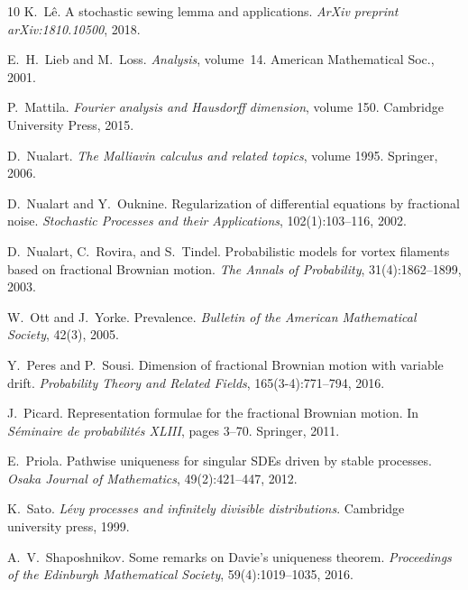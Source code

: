 \documentclass[10pt]{article}
\newcommand{\tmtextit}[1]{{\itshape{#1}}}
\begin{document}
\begin{thebibliography}{10}
  K.~L{\^e}. {\newblock}A stochastic sewing lemma and
  applications. {\newblock}\tmtextit{ArXiv preprint arXiv:1810.10500},
  2018.{\newblock}
  
  E.~H.~Lieb  and  M.~Loss. {\newblock}\tmtextit{Analysis}, 
  volume~14. {\newblock}American Mathematical Soc., 2001.{\newblock}
  
  P.~Mattila. {\newblock}\tmtextit{Fourier analysis and
  Hausdorff dimension},  volume  150. {\newblock}Cambridge University Press,
  2015.{\newblock}
  
  D.~Nualart. {\newblock}\tmtextit{The Malliavin
  calculus and related topics},  volume  1995. {\newblock}Springer,
  2006.{\newblock}
  
  D.~Nualart  and  Y.~Ouknine.
  {\newblock}Regularization of differential equations by fractional noise.
  {\newblock}\tmtextit{Stochastic Processes and their Applications},
  102(1):103--116, 2002.{\newblock}
  
  D.~Nualart, C.~Rovira, and  S.~Tindel.
  {\newblock}Probabilistic models for vortex filaments based on fractional
  Brownian motion. {\newblock}\tmtextit{The Annals of Probability},
  31(4):1862--1899, 2003.{\newblock}
  
  W.~Ott  and  J.~Yorke. {\newblock}Prevalence.
  {\newblock}\tmtextit{Bulletin of the American Mathematical Society}, 42(3),
  2005.{\newblock}
  
  Y.~Peres  and  P.~Sousi. {\newblock}Dimension of
  fractional Brownian motion with variable drift.
  {\newblock}\tmtextit{Probability Theory and Related Fields},
  165(3-4):771--794, 2016.{\newblock}
  
  J.~Picard. {\newblock}Representation formulae for the
  fractional Brownian motion. {\newblock}In \tmtextit{S{\'e}minaire de
  probabilit{\'e}s XLIII},  pages  3--70. Springer, 2011.{\newblock}
  
  E.~Priola. {\newblock}Pathwise uniqueness for
  singular SDEs driven by stable processes. {\newblock}\tmtextit{Osaka Journal
  of Mathematics}, 49(2):421--447, 2012.{\newblock}
  
  K.~Sato. {\newblock}\tmtextit{L{\'e}vy processes and
  infinitely divisible distributions}. {\newblock}Cambridge university press,
  1999.{\newblock}
  
  A.~V.~Shaposhnikov. {\newblock}Some remarks on
  Davie's uniqueness theorem. {\newblock}\tmtextit{Proceedings of the
  Edinburgh Mathematical Society}, 59(4):1019--1035, 2016.{\newblock}
  

\end{thebibliography}
\end{document}
